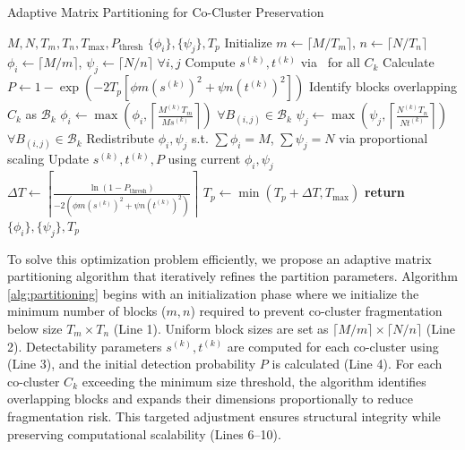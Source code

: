 \documentclass[journal]{IEEEtran}
\theoremstyle{definition}
\theoremstyle{remark} %
\begin{document}
\begin{algorithm}[!t]
    \caption{Adaptive Matrix Partitioning for Co-Cluster Preservation}
    \begin{algorithmic}[1]
        \REQUIRE $M, N, T_m, T_n, T_{\text{max}}, P_{\text{thresh}}$
        \ENSURE $\{\phi_i\}, \{\psi_j\}, T_p$
        \STATE Initialize $m \gets \lceil M / T_m \rceil$, $n \gets \lceil N / T_n \rceil$ 
        \STATE $\phi_i \gets \lceil M/m \rceil$, $\psi_j \gets \lceil N/n \rceil$ $\forall i,j$ 
        \STATE Compute $s^{(k)}, t^{(k)}$ via~ for all $C_k$
        \STATE Calculate $P \gets 1 - \exp\left( -2 T_p \left[ \phi m (s^{(k)})^2 + \psi n (t^{(k)})^2 \right] \right)$
        \STATE Identify blocks overlapping $C_k$ as $\mathcal{B}_k$
        \STATE $\phi_i \gets \max\left( \phi_i, \left\lceil \frac{M^{(k)} T_m}{M s^{(k)}} \right\rceil \right)$ $\forall B_{(i,j)} \in \mathcal{B}_k$
        \STATE $\psi_j \gets \max\left( \psi_j, \left\lceil \frac{N^{(k)} T_n}{N t^{(k)}} \right\rceil \right)$ $\forall B_{(i,j)} \in \mathcal{B}_k$
        \ENDFOR
        \STATE Redistribute $\phi_i, \psi_j$ s.t. $\sum \phi_i = M$, $\sum \psi_j = N$ via proportional scaling
        \STATE Update $s^{(k)}, t^{(k)}, P$ using current $\phi_i, \psi_j$
        \STATE $\Delta T \gets \left\lceil \frac{\ln(1 - P_{\text{thresh}})}{-2 \left( \phi m (s^{(k)})^2 + \psi n (t^{(k)})^2 \right)} \right\rceil$
        \STATE $T_p \gets \min(T_p + \Delta T, T_{\text{max}})$
        \ENDIF
        \ENDWHILE
        \STATE \textbf{return} $\{\phi_i\}, \{\psi_j\}, T_p$
    \end{algorithmic}
    \label{alg:partitioning}
\end{algorithm}

To solve this optimization problem efficiently, we propose an adaptive matrix partitioning algorithm that iteratively refines the partition parameters. Algorithm \ref{alg:partitioning} begins with an initialization phase where we initialize the minimum number of blocks ($m,n$) required to prevent co-cluster fragmentation below size $T_m \times T_n$ (Line 1). Uniform block sizes are set as $\lceil M/m \rceil \times \lceil N/n \rceil$ (Line 2). Detectability parameters $s^{(k)}, t^{(k)}$ are computed for each co-cluster using~ (Line 3), and the initial detection probability $P$ is calculated (Line 4).
    {\color{blue}For each co-cluster $C_k$ exceeding the minimum size threshold, the algorithm identifies overlapping blocks and expands their dimensions proportionally to reduce fragmentation risk. This targeted adjustment ensures structural integrity while preserving computational scalability (Lines 6--10).}
\end{document}
